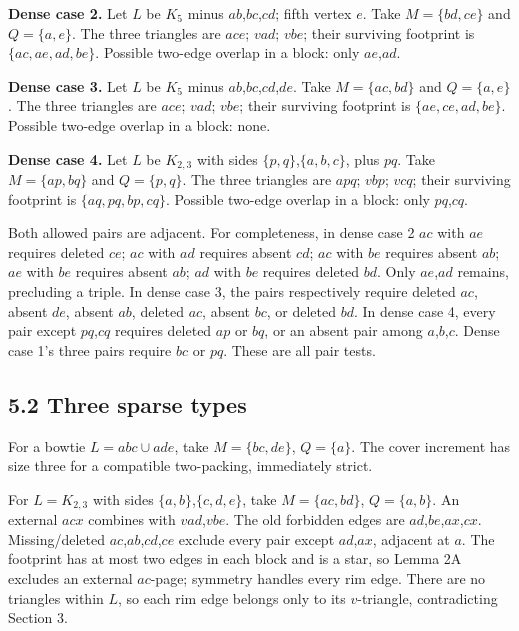 \documentclass[11pt]{article}
\begin{document}
\textbf{Dense case 2.} Let \(L\) be \(K_5\) minus \(ab\),\(bc\),\(cd\);
fifth vertex \(e\). Take \(M=\{bd,ce\}\) and \(Q=\{a,e\}\). The three
triangles are \(ace\); \(vad\); \(vbe\); their surviving footprint is
\(\{ac,ae,ad,be\}\). Possible two-edge overlap in a block: only
\(ae\),\(ad\).

\textbf{Dense case 3.} Let \(L\) be \(K_5\) minus
\(ab\),\(bc\),\(cd\),\(de\). Take \(M=\{ac,bd\}\) and \(Q=\{a,e\}\). The
three triangles are \(ace\); \(vad\); \(vbe\); their surviving footprint
is \(\{ae,ce,ad,be\}\). Possible two-edge overlap in a block: none.

\textbf{Dense case 4.} Let \(L\) be \(K_{2,3}\) with sides
\(\{p,q\}\),\(\{a,b,c\}\), plus \(pq\). Take \(M=\{ap,bq\}\) and
\(Q=\{p,q\}\). The three triangles are \(apq\); \(vbp\); \(vcq\); their
surviving footprint is \(\{aq,pq,bp,cq\}\). Possible two-edge overlap in
a block: only \(pq\),\(cq\).

Both allowed pairs are adjacent. For completeness, in dense case 2
\(ac\) with \(ae\) requires deleted \(ce\); \(ac\) with \(ad\) requires
absent \(cd\); \(ac\) with \(be\) requires absent \(ab\); \(ae\) with
\(be\) requires absent \(ab\); \(ad\) with \(be\) requires deleted
\(bd\). Only \(ae\),\(ad\) remains, precluding a triple. In dense case
3, the pairs respectively require deleted \(ac\), absent \(de\), absent
\(ab\), deleted \(ac\), absent \(bc\), or deleted \(bd\). In dense case
4, every pair except \(pq\),\(cq\) requires deleted \(ap\) or \(bq\), or
an absent pair among \(a\),\(b\),\(c\). Dense case 1's three pairs
require \(bc\) or \(pq\). These are all pair tests.

\subsection{5.2 Three sparse types}\label{three-sparse-types}

For a bowtie \(L=abc\cup ade\), take \(M=\{bc,de\}\), \(Q=\{a\}\). The
cover increment has size three for a compatible two-packing, immediately
strict.

For \(L=K_{2,3}\) with sides \(\{a,b\}\),\(\{c,d,e\}\), take
\(M=\{ac,bd\}\), \(Q=\{a,b\}\). An external \(acx\) combines with
\(vad\),\(vbe\). The old forbidden edges are
\(ad\),\(be\),\(ax\),\(cx\). Missing/deleted \(ac\),\(ab\),\(cd\),\(ce\)
exclude every pair except \(ad\),\(ax\), adjacent at \(a\). The
footprint has at most two edges in each block and is a star, so Lemma 2A
excludes an external \(ac\)-page; symmetry handles every rim edge. There
are no triangles within \(L\), so each rim edge belongs only to its
\(v\)-triangle, contradicting Section 3.
\end{document}
